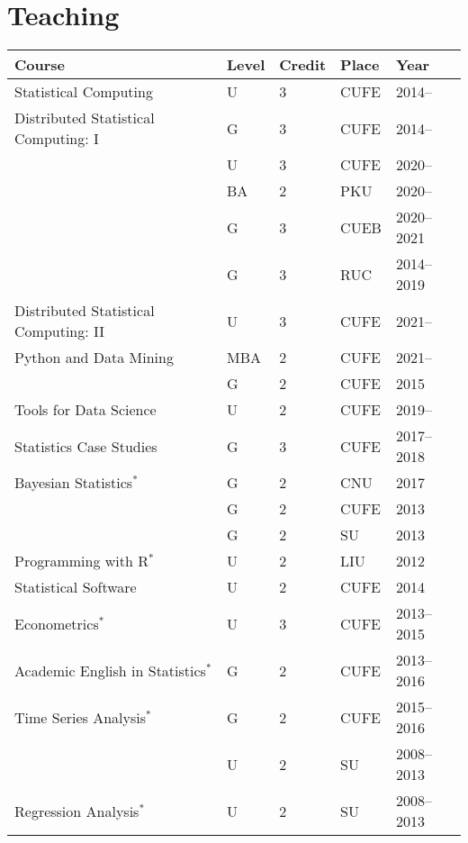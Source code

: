 \documentclass[twoside,a4paper]{article}
\begin{document}
\section*{Teaching}
\begin{center}
  \begin{tabular}{p{7.5cm}llll}
    \toprule
    Course                                  & Level & Credit  &Place         & Year       \\
    \midrule
    {Statistical Computing}                 & U     & 3  &CUFE          & 2014--     \\
    {Distributed Statistical Computing: I}  & G     & 3  &CUFE          & 2014--     \\
                                            & U     & 3  &CUFE          & 2020--     \\
                                            & BA     & 2  &PKU           & 2020--     \\
                                            & G     & 3  &CUEB          & 2020--2021 \\
                                            & G     & 3  &RUC           & 2014--2019 \\
    {Distributed Statistical Computing: II} & U     & 3  &CUFE          & 2021--     \\
    {Python and Data Mining}   & MBA   & 2  &CUFE          & 2021--     \\
                                            & G     & 2  &CUFE          & 2015       \\
    {Tools for Data Science}                & U     & 2  &CUFE          & 2019--     \\
    {Statistics Case Studies}               & G     & 3  &CUFE          & 2017--2018 \\
    {Bayesian Statistics}$^*$               & G     & 2  &CNU           & 2017       \\
                                            & G     & 2  &CUFE          & 2013       \\
                                            & G     & 2  &SU            & 2013       \\
    {Programming with R}$^*$                & U     & 2  &LIU           & 2012       \\
    {Statistical Software}                  & U     & 2  &CUFE          & 2014       \\
    {Econometrics}$^*$                      & U     & 3  &CUFE          & 2013--2015 \\
    {Academic English in Statistics}$^*$    & G     & 2  &CUFE          & 2013--2016 \\
    {Time Series Analysis}$^*$             & G     & 2  &CUFE          & 2015--2016 \\
                                            & U     & 2  &SU            & 2008--2013 \\
    {Regression Analysis}$^*$               & U     & 2  &SU            & 2008--2013 \\
    \bottomrule
  \end{tabular}
\end{center}
\end{document}
